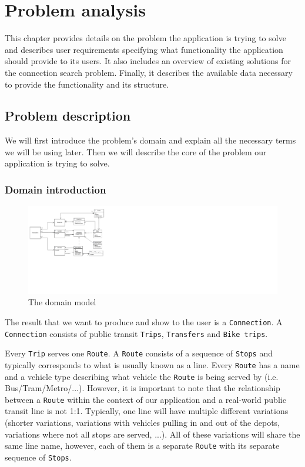 \chapter{Problem analysis}

This chapter provides details on the problem the application is trying to solve and describes user requirements specifying what functionality the application should provide to its users. It also includes an overview of existing solutions for the connection search problem. Finally, it describes the available data necessary to provide the functionality and its structure.

\section{Problem description}

We will first introduce the problem's domain and explain all the necessary terms we will be using later. Then we will describe the core of the problem our application is trying to solve.

\subsection{Domain introduction}

\begin{figure}[h!]
    \includegraphics[width=\textwidth]{img/domain_model.pdf}
    \caption{The domain model}
    \label{fig:domain_model}
\end{figure}

The result that we want to produce and show to the user is a \texttt{Connection}. A \texttt{Connection} consists of public transit \texttt{Trips}, \texttt{Transfers} and \texttt{Bike trips}. 

Every \texttt{Trip} serves one \texttt{Route}. A \texttt{Route} consists of a sequence of \texttt{Stops} and typically corresponds to what is usually known as a line. Every \texttt{Route} has a name and a vehicle type describing what vehicle the \texttt{Route} is being served by (i.e. Bus/Tram/Metro/...). However, it is important to note that the relationship between a \texttt{Route} within the context of our application and a real-world public transit line is not 1:1. Typically, one line will have multiple different variations (shorter variations, variations with vehicles pulling in and out of the depots, variations where not all stops are served, ...). All of these variations will share the same line name, however, each of them is a separate \texttt{Route} with its separate sequence of \texttt{Stops}.

